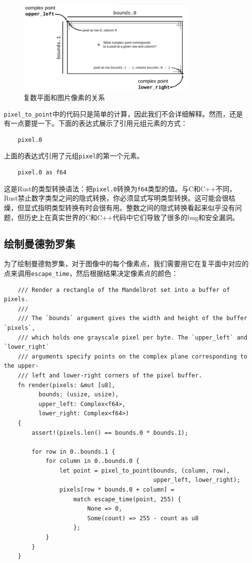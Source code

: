 \begin{figure}[htbp]
    \centering
    \includegraphics[width=0.8\textwidth]{../img/f2-4.png}
    \caption{复数平面和图片像素的关系}
    \label{f2-4}
\end{figure}

\texttt{pixel\_to\_point}中的代码只是简单的计算，因此我们不会详细解释。然而，还是有一点要提一下。下面的表达式展示了引用元组元素的方式：
\begin{verbatim}
    pixel.0
\end{verbatim}
上面的表达式引用了元组\texttt{pixel}的第一个元素。

\begin{verbatim}
    pixel.0 as f64
\end{verbatim}

这是Rust的类型转换语法：把\texttt{pixel.0}转换为\texttt{f64}类型的值。与C和C++不同，Rust禁止数字类型之间的隐式转换，你必须显式写明类型转换。这可能会很枯燥，但显式指明类型转换有时会很有用。整数之间的隐式转换看起来似乎没有问题，但历史上在真实世界的C和C++代码中它们导致了很多的bug和安全漏洞。

\subsection{绘制曼德勃罗集}
为了绘制曼德勃罗集，对于图像中的每个像素点，我们需要用它在复平面中对应的点来调用\texttt{escape\_time}，然后根据结果决定像素点的颜色：
\begin{verbatim}
    /// Render a rectangle of the Mandelbrot set into a buffer of pixels.
    ///
    /// The `bounds` argument gives the width and height of the buffer `pixels`,
    /// which holds one grayscale pixel per byte. The `upper_left` and `lower_right`
    /// arguments specify points on the complex plane corresponding to the upper-
    /// left and lower-right corners of the pixel buffer.
    fn render(pixels: &mut [u8],
          bounds: (usize, usize),
          upper_left: Complex<f64>,
          lower_right: Complex<f64>)
    {
        assert!(pixels.len() == bounds.0 * bounds.1);

        for row in 0..bounds.1 {
            for column in 0..bounds.0 {
                let point = pixel_to_point(bounds, (column, row),
                                           upper_left, lower_right);
                pixels[row * bounds.0 + column] = 
                    match escape_time(point, 255) {
                        None => 0,
                        Some(count) => 255 - count as u8
                    };
            }
        }
    }
\end{verbatim}

